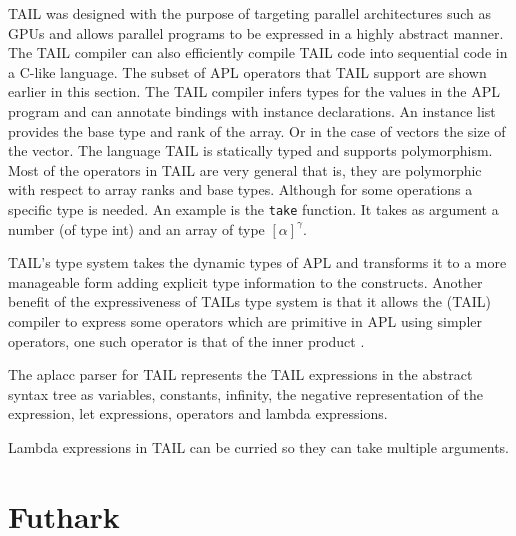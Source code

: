 \documentclass[11pt]{article}
\begin{document}
TAIL was designed with the purpose of targeting parallel architectures such as GPUs and allows parallel programs to be
expressed in a highly abstract manner.
The TAIL compiler can also efficiently compile TAIL code into sequential code in a C-like language.
The subset of APL operators that TAIL support are shown earlier in this section.
The TAIL compiler infers types for the values in the APL program and can annotate bindings with
instance declarations. An instance list provides the base type and rank of the array. Or in
the case of vectors the size of the vector.
The language TAIL is statically typed and supports polymorphism. 
Most of the operators in TAIL are very general that is, they are polymorphic with respect to array ranks and base types.
Although for some operations a specific type is needed.
An example is the {\tt take} function. It takes as argument a number (of type int) and an array of type $[\alpha]^\gamma$.

TAIL's type system takes the dynamic types of APL and transforms it to a more manageable form adding explicit type
information to the constructs.
Another benefit of the expressiveness of TAILs type system is that it allows the (TAIL) compiler to express some operators which
are primitive in APL using simpler operators, one such operator is that of the inner product \cite{ElsmanDybdal:Array:2014}. 

The aplacc parser for TAIL represents the TAIL expressions in the abstract syntax tree as variables, constants, infinity, the negative representation of 
the expression, let expressions, operators and lambda expressions. 


Lambda expressions in TAIL can be curried so they can take multiple arguments.




\section{Futhark}
\label{sec:futhark}
\end{document}
